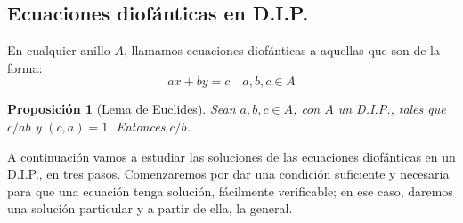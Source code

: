 \documentclass[11pt, a4paper, titlepage]{article}
\newif\IfInSansMode
\theoremstyle{theorem-style}
\newtheorem{nprop}{Proposición}[section]
\theoremstyle{definition-style}
\theoremstyle{remark-style}
\theoremstyle{example-style}
\begin{document}
\subsection{Ecuaciones diofánticas en D.I.P.}

En cualquier anillo $A$, llamamos ecuaciones diofánticas a aquellas que son de la forma:
\[
ax +by  = c \quad a,b,c \in A
\]

\begin{nprop}[Lema de Euclides]
  Sean $a,b,c \in A$, con $A$ un D.I.P., tales que $c/ab$ y $(c,a)=1$. Entonces $c/b$.
\end{nprop}

A continuación vamos a estudiar las soluciones de las ecuaciones diofánticas en un D.I.P., en tres pasos.
Comenzaremos por dar una condición suficiente y necesaria para que una ecuación tenga solución,
fácilmente verificable; en ese caso, daremos una solución particular y a partir de ella, la general.
\end{document}
